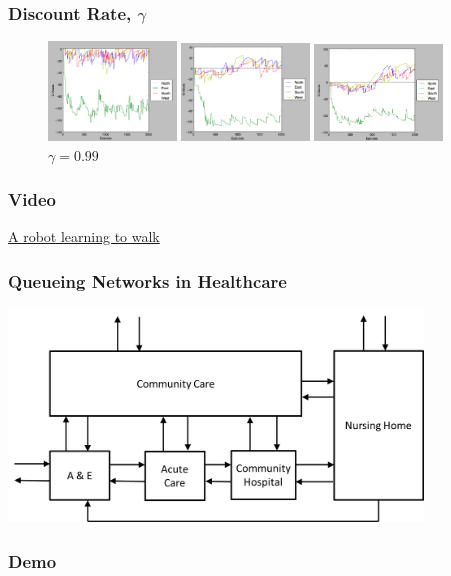 \documentclass{beamer}
\begin{document}
\begin{frame}
	\frametitle{Discount Rate, $\gamma$}
\begin{figure}
	\begin{minipage}{.32\textwidth}
		\includegraphics[width=3.4cm]{Images/30a1g1}
			\caption{$\gamma = 0.1$}
	\end{minipage}
	\begin{minipage}{0.32\textwidth}
		\includegraphics[width=3.4cm]{Images/30a1g9}
			\caption{$\gamma = 0.9$}
	\end{minipage}
	\begin{minipage}{0.32\textwidth}
		\includegraphics[width=3.4cm]{Images/30a1g99}
			\caption{$\gamma = 0.99$}
	\end{minipage}
\end{figure}
\end{frame}

\begin{frame}
  \frametitle{Video}
  \href{https://www.youtube.com/watch?v=CthhCy-1Jeg}{A robot learning to walk}
\end{frame}

\begin{frame}
	\frametitle{Queueing Networks in Healthcare}
	\includegraphics[width=11cm]{Images/examplehealthsystem}
\end{frame}

\begin{frame}
	\frametitle{Demo}
\end{frame}
\end{document}
